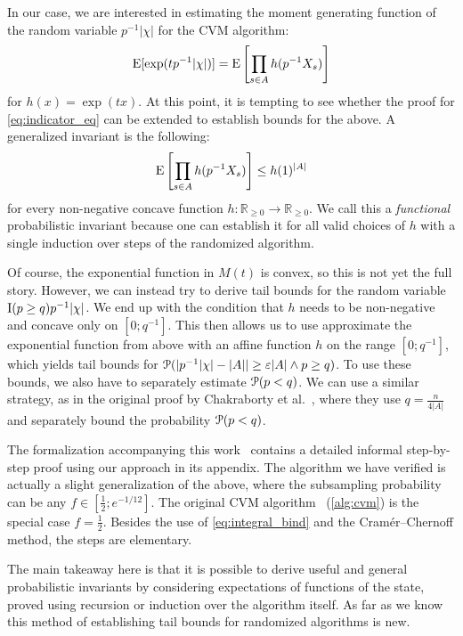 In our case, we are interested in estimating the moment generating function of the random variable $p^{-1} |\chi|$ for the CVM algorithm:
\[
  \operatorname{\mathrm{E}} [\exp( t p^{-1} |\chi| )] = \operatorname{\mathrm{E}} \left[ \prod_{s \in A} h(p^{-1} X_s) \right]
\]
for $h(x) = \exp(tx)$.
At this point, it is tempting to see whether the proof for \cref{eq:indicator_eq} can be extended to establish bounds for the above.
A generalized invariant is the following:
\[
  \operatorname{\mathrm{E}} \left[ \prod_{s \in A} h(p^{-1} X_s) \right] \leq h(1)^{|A|}
\]
for every non-negative concave function $h : \mathbb R_{\geq 0} \rightarrow \mathbb R_{\geq 0}$.
We call this a \emph{functional} probabilistic invariant because one can establish it for all valid choices of $h$ with a single induction over steps of the randomized algorithm.

Of course, the exponential function in $M(t)$ is convex, so this is not yet the full story.
However, we can instead try to derive tail bounds for the random variable $\operatorname{\mathrm{I}}(p \geq q) p^{-1} |\chi|$.
We end up with the condition that $h$ needs to be non-negative and concave only on $[0;q^{-1}]$.
This then allows us to use approximate the exponential function from above with an affine function $h$ on the range $[0;q^{-1}]$, which yields tail bounds for $\operatorname{\mathcal P}( |p^{-1} |\chi| - |A|| \geq \varepsilon |A| \wedge p \geq q)$.
To use these bounds, we also have to separately estimate $\operatorname{\mathcal P}(p < q)$.
We can use a similar strategy, as in the original proof by Chakraborty et al.~\cite{chakraborty2022}, where they use $q = \frac{n}{4 |A|}$ and separately bound the probability $\operatorname{\mathcal P}(p < q)$.

The formalization accompanying this work~\todo{[cite]} contains a detailed informal step-by-step proof using our approach in its appendix.
The algorithm we have verified is actually a slight generalization of the above, where the subsampling probability can be any $f \in [\frac{1}{2};e^{-1/12}]$.
The original CVM algorithm~\cite{chakraborty2022} (\cref{alg:cvm}) is the special case $f=\frac{1}{2}$.
Besides the use of \cref{eq:integral_bind} and the Cram\'er--Chernoff method, the steps are elementary.

The main takeaway here is that it is possible to derive useful and general probabilistic invariants by considering expectations of functions of the state, proved using recursion or induction over the algorithm itself.
As far as we know this method of establishing tail bounds for randomized algorithms is new.

